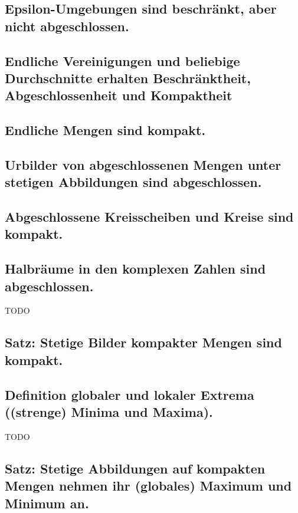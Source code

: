 \subsection{Epsilon-Umgebungen sind beschränkt, aber nicht abgeschlossen.}

\subsection{Endliche Vereinigungen und beliebige Durchschnitte erhalten Beschränktheit, Abgeschlossenheit und Kompaktheit}

\subsection{Endliche Mengen sind kompakt.}

\subsection{Urbilder von abgeschlossenen Mengen unter stetigen Abbildungen sind abgeschlossen.}

\subsection{Abgeschlossene Kreisscheiben und Kreise sind kompakt.}

\subsection{Halbräume in den komplexen Zahlen sind abgeschlossen.}

TODO

\subsection{Satz: Stetige Bilder kompakter Mengen sind kompakt.}

\subsection{Definition globaler und lokaler Extrema ((strenge) Minima und Maxima).}

TODO

\subsection{Satz: Stetige Abbildungen auf kompakten Mengen nehmen ihr (globales) Maximum und Minimum an.}

